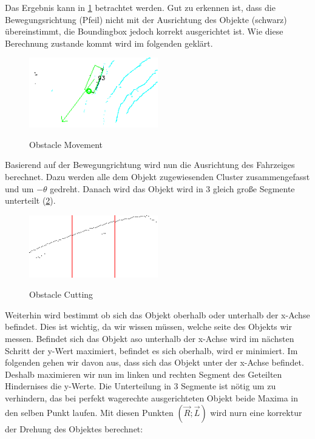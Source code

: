 \documentclass[11pt,oneside,openright]{mpreport}
\begin{document}
Das Ergebnis kann in \cref{obst_rot} betrachtet werden. Gut zu erkennen ist, dass die Bewegungsrichtung (Pfeil) nicht mit der Ausrichtung des Objekte (schwarz) übereinstimmt,
die Boundingbox jedoch korrekt ausgerichtet ist. Wie diese Berechnung zustande kommt wird im folgenden geklärt.

\begin{figure}[!ht]
\caption{Obstacle Movement}
\includegraphics[width=0.5\textwidth]{bilder/obst_rot.png}
\label{obst_rot}
\end{figure}

Basierend auf der Bewegungrichtung wird nun die Ausrichtung des Fahrzeiges berechnet. Dazu werden alle dem Objekt zugewiesenden Cluster zusammengefasst und um $-\theta$ gedreht.
Danach wird das Objekt wird in 3 gleich große Segmente unterteilt (\cref{obst_devide}).

\begin{figure}[!ht]
\caption{Obstacle Cutting}
\includegraphics[width=0.5\textwidth]{bilder/obst_devide.png}
\label{obst_devide}
\end{figure}

Weiterhin wird bestimmt ob sich das Objekt oberhalb oder unterhalb der x-Achse befindet. Dies ist wichtig, da wir wissen müssen, welche seite des Objekts wir messen.
Befindet sich das Objekt aso unterhalb der x-Achse wird im nächsten Schritt der y-Wert maximiert, befindet es sich oberhalb, wird er minimiert.
Im folgenden gehen wir davon aus, dass sich das Objekt unter der x-Achse befindet. Deshalb maximieren wir nun im linken und rechten Segment des Geteilten
Hindernises die y-Werte. Die Unterteilung in 3 Segmente ist nötig um zu verhindern, das bei perfekt wagerechte ausgerichteten Objekt beide Maxima in den selben Punkt laufen.
Mit diesen Punkten $(\vec{R};\vec{L})$ wird nurn eine korrektur der Drehung des Objektes berechnet:
\end{document}
